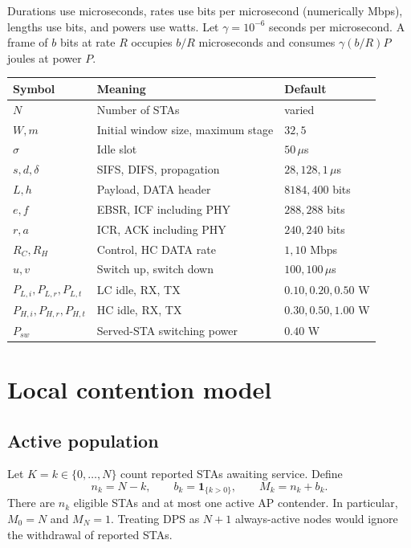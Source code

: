 \documentclass[11pt,a4paper]{article}
\newcommand{\ind}{\mathbf{1}}
\begin{document}
Durations use microseconds, rates use bits per microsecond (numerically Mbps),
lengths use bits, and powers use watts. Let $\gamma=10^{-6}$ seconds per
microsecond. A frame of $b$ bits at rate $R$ occupies $b/R$ microseconds
and consumes $\gamma(b/R)P$ joules at power $P$.
\begin{longtable}{@{}lll@{}}
\toprule Symbol & Meaning & Default\\\midrule
$N$ & Number of STAs & varied\\
$W,m$ & Initial window size, maximum stage & $32,5$\\
$\sigma$ & Idle slot & $50\,\mu$s\\
$s,d,\delta$ & SIFS, DIFS, propagation & $28,128,1\,\mu$s\\
$L,h$ & Payload, DATA header & $8184,400$ bits\\
$e,f$ & EBSR, ICF including PHY & $288,288$ bits\\
$r,a$ & ICR, ACK including PHY & $240,240$ bits\\
$R_C,R_H$ & Control, HC DATA rate & $1,10$ Mbps\\
$u,v$ & Switch up, switch down & $100,100\,\mu$s\\
$P_{L,i},P_{L,r},P_{L,t}$ & LC idle, RX, TX & $0.10,0.20,0.50$ W\\
$P_{H,i},P_{H,r},P_{H,t}$ & HC idle, RX, TX & $0.30,0.50,1.00$ W\\
$P_{sw}$ & Served-STA switching power & $0.40$ W\\
\bottomrule
\end{longtable}

\section{Local contention model}
\subsection{Active population}
Let $K=k\in\{0,\ldots,N\}$ count reported STAs awaiting service. Define
\begin{equation}
n_k=N-k,\qquad b_k=\ind_{\{k>0\}},\qquad M_k=n_k+b_k.
\end{equation}
There are $n_k$ eligible STAs and at most one active AP contender. In
particular, $M_0=N$ and $M_N=1$. Treating DPS as $N+1$ always-active nodes
would ignore the withdrawal of reported STAs.
\end{document}
